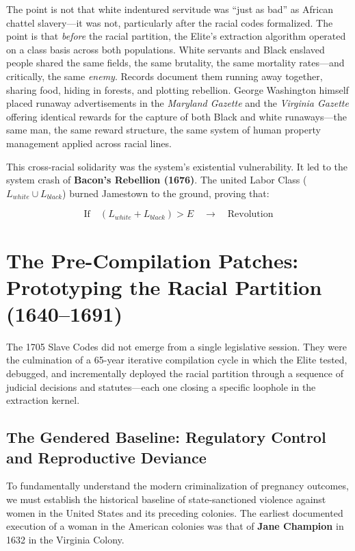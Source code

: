 \documentclass[12pt,openany]{book}
\begin{document}
The point is not that white indentured servitude was ``just as bad'' as African chattel slavery---it was not, particularly after the racial codes formalized. The point is that \textit{before} the racial partition, the Elite's extraction algorithm operated on a class basis across both populations. White servants and Black enslaved people shared the same fields, the same brutality, the same mortality rates---and critically, the same \textit{enemy}. Records document them running away together, sharing food, hiding in forests, and plotting rebellion. George Washington himself placed runaway advertisements in the \textit{Maryland Gazette} and the \textit{Virginia Gazette} offering identical rewards for the capture of both Black and white runaways---the same man, the same reward structure, the same system of human property management applied across racial lines.

This cross-racial solidarity was the system's existential vulnerability. It led to the system crash of \textbf{Bacon's Rebellion (1676)}. The united Labor Class ($L_{white} \cup L_{black}$) burned Jamestown to the ground, proving that:

\[
\text{If} \quad (L_{white} + L_{black}) > E \quad \rightarrow \quad \text{Revolution}
\]

\section{The Pre-Compilation Patches: Prototyping the Racial Partition (1640--1691)}

The 1705 Slave Codes did not emerge from a single legislative session. They were the culmination of a 65-year iterative compilation cycle in which the Elite tested, debugged, and incrementally deployed the racial partition through a sequence of judicial decisions and statutes---each one closing a specific loophole in the extraction kernel.

\subsection{The Gendered Baseline: Regulatory Control and Reproductive Deviance}

To fundamentally understand the modern criminalization of pregnancy outcomes, we must establish the historical baseline of state-sanctioned violence against women in the United States and its preceding colonies. The earliest documented execution of a woman in the American colonies was that of \textbf{Jane Champion} in 1632 in the Virginia Colony. 
\end{document}
